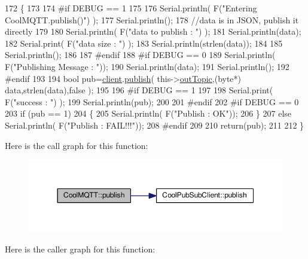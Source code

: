 \begin{DoxyCode}
172 \{
173 
174 \textcolor{preprocessor}{#if DEBUG == 1 }
175 
176     Serial.println( F(\textcolor{stringliteral}{"Entering CoolMQTT.publish()"}) );
177     Serial.println();
178     \textcolor{comment}{//data is in JSON, publish it directly}
179 
180     Serial.println( F(\textcolor{stringliteral}{"data to publish : "}) );
181     Serial.println(data);
182     Serial.print( F(\textcolor{stringliteral}{"data size : "}) );
183     Serial.println(strlen(data));
184 
185     Serial.println();
186 
187 \textcolor{preprocessor}{#endif}
188 \textcolor{preprocessor}{#if DEBUG == 0}
189     Serial.println( F(\textcolor{stringliteral}{"Publishing Message : "}));
190     Serial.println(data);
191     Serial.println();
192 \textcolor{preprocessor}{#endif}
193 
194     \textcolor{keywordtype}{bool} pub=\hyperlink{class_cool_m_q_t_t_afed1372683c44893b4668d0f1771f514}{client}.\hyperlink{class_cool_pub_sub_client_ab6ad5fa2d3db8f91454027257f225a89}{publish}( this->\hyperlink{class_cool_m_q_t_t_a109c786a17b463f9eeba046194279522}{outTopic},(byte*) data,strlen(data),\textcolor{keyword}{false}  );
195 
196 \textcolor{preprocessor}{#if DEBUG == 1 }
197 
198     Serial.print( F(\textcolor{stringliteral}{"success : "}) );
199     Serial.println(pub);    
200 
201 \textcolor{preprocessor}{#endif}
202 \textcolor{preprocessor}{#if DEBUG == 0}
203     \textcolor{keywordflow}{if} (pub == 1)
204     \{
205         Serial.println( F(\textcolor{stringliteral}{"Publish : OK"}));
206     \}
207     \textcolor{keywordflow}{else} Serial.println( F(\textcolor{stringliteral}{"Publish : FAIL!!!"}));
208 \textcolor{preprocessor}{#endif}
209 
210     \textcolor{keywordflow}{return}(pub);
211 
212 \}
\end{DoxyCode}
Here is the call graph for this function\+:\nopagebreak
\begin{figure}[H]
\begin{center}
\leavevmode
\includegraphics[width=350pt]{d0/dd0/class_cool_m_q_t_t_ace977b3e90ab14b1199fe5c4fb0a13ec_cgraph}
\end{center}
\end{figure}
Here is the caller graph for this function\+:\nopagebreak
